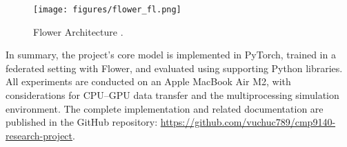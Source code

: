 \begin{figure}[h]
    \centering
    \texttt{[image: figures/flower\_fl.png]}
    \caption{Flower Architecture \citep{flower-architecture}.}
    \label{fig:flower_fl}
\end{figure}

In summary, the project’s core model is implemented in PyTorch, trained in a federated setting with Flower, and evaluated using supporting Python libraries. All experiments are conducted on an Apple MacBook Air M2, with considerations for CPU–GPU data transfer and the multiprocessing simulation environment. The complete implementation and related documentation are published in the GitHub repository: \url{https://github.com/vuchuc789/cmp9140-research-project}.
